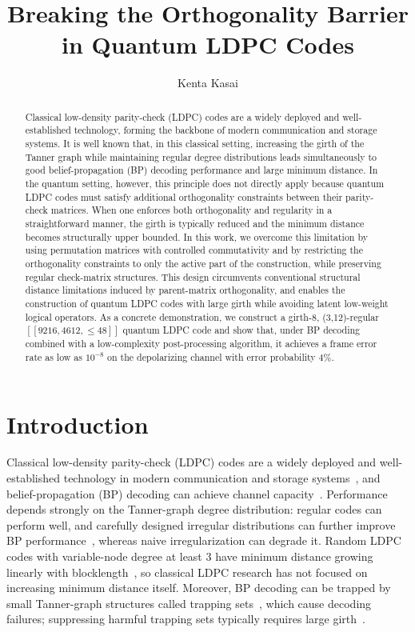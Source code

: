 \documentclass[a4paper,onecolumn,11pt,accepted=2026-08-03]{quantumarticle}
\title{Breaking the Orthogonality Barrier in Quantum LDPC Codes}
\author{Kenta Kasai}
\affiliation{Institute of Science Tokyo}
\renewcommand\[{\begin{equation}}
\renewcommand\]{\end{equation}}
\theoremstyle{definition}
\begin{document}
\maketitle

\begin{abstract}
Classical low-density parity-check (LDPC) codes are a widely deployed and well-established technology, forming the backbone of modern communication and storage systems.
It is well known that, in this classical setting, increasing the girth of the Tanner graph while maintaining regular degree distributions leads simultaneously to good belief-propagation (BP) decoding performance and large minimum distance.
In the quantum setting, however, this principle does not directly apply because quantum LDPC codes must satisfy additional orthogonality constraints between their parity-check matrices.
When one enforces both orthogonality and regularity in a straightforward manner, the girth is typically reduced and the minimum distance becomes structurally upper bounded.
In this work, we overcome this limitation by using permutation matrices with controlled commutativity and by restricting the orthogonality constraints to only the active part of the construction, while preserving regular check-matrix structures. This design circumvents conventional structural distance limitations induced by parent-matrix orthogonality, and enables the construction of quantum LDPC codes with large girth while avoiding latent low-weight logical operators.
As a concrete demonstration, we construct a girth-8, (3,12)-regular \([[9216,4612, \leq 48]]\) quantum LDPC code and show that, under BP decoding combined with a low-complexity post-processing algorithm, it achieves a frame error rate as low as  \(10^{-8}\) on the depolarizing channel with error probability \(4 \%\).
\end{abstract}


\section{Introduction}
Classical low-density parity-check (LDPC) codes are a widely deployed and well-established technology in modern communication and storage systems~\cite{Gallager1963}, and   belief-propagation (BP)  decoding can achieve channel capacity~\cite{KudekarRichardsonUrbanke2013,RichardsonUrbanke2001}. Performance depends strongly on the Tanner-graph degree distribution: regular codes can perform well, and carefully designed irregular distributions can further improve BP performance~\cite{RichardsonShokrollahiUrbanke2001}, whereas naive irregularization can degrade it. Random LDPC codes with variable-node degree at least 3 have minimum distance growing linearly with blocklength~\cite{RichardsonUrbanke2008,Gallager1963}, so classical LDPC research has not focused on increasing minimum distance itself. Moreover, BP decoding can be trapped by small Tanner-graph structures called trapping sets~\cite{Richardson2003ErrorFloors}, which cause decoding failures; suppressing harmful trapping sets typically requires large girth~\cite{Tanner1981}.
\end{document}
